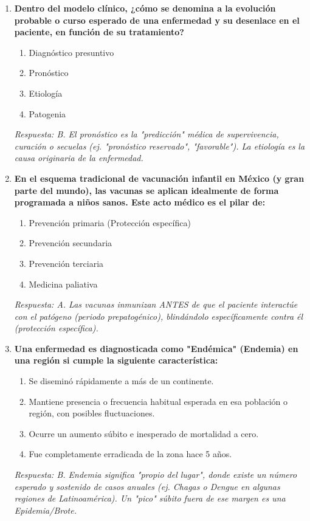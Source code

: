 \begin{enumerate}[label=\textbf{\arabic*.}]
    \item \textbf{Dentro del modelo clínico, ¿cómo se denomina a la evolución probable o curso esperado de una enfermedad y su desenlace en el paciente, en función de su tratamiento?}
    \begin{enumerate}
        \item[A)] Diagnóstico presuntivo
        \item[B)] Pronóstico
        \item[C)] Etiología
        \item[D)] Patogenia
    \end{enumerate}
    \textit{Respuesta: B. El pronóstico es la "predicción" médica de supervivencia, curación o secuelas (ej. "pronóstico reservado", "favorable"). La etiología es la causa originaria de la enfermedad.}

    \item \textbf{En el esquema tradicional de vacunación infantil en México (y gran parte del mundo), las vacunas se aplican idealmente de forma programada a niños sanos. Este acto médico es el pilar de:}
    \begin{enumerate}
        \item[A)] Prevención primaria (Protección específica)
        \item[B)] Prevención secundaria
        \item[C)] Prevención terciaria
        \item[D)] Medicina paliativa
    \end{enumerate}
    \textit{Respuesta: A. Las vacunas inmunizan ANTES de que el paciente interactúe con el patógeno (periodo prepatogénico), blindándolo específicamente contra él (protección específica).}

    \item \textbf{Una enfermedad es diagnosticada como "Endémica" (Endemia) en una región si cumple la siguiente característica:}
    \begin{enumerate}
        \item[A)] Se diseminó rápidamente a más de un continente.
        \item[B)] Mantiene presencia o frecuencia habitual esperada en esa población o región, con posibles fluctuaciones.
        \item[C)] Ocurre un aumento súbito e inesperado de mortalidad a cero.
        \item[D)] Fue completamente erradicada de la zona hace 5 años.
    \end{enumerate}
    \textit{Respuesta: B. Endemia significa "propio del lugar", donde existe un número esperado y sostenido de casos anuales (ej. Chagas o Dengue en algunas regiones de Latinoamérica). Un "pico" súbito fuera de ese margen es una Epidemia/Brote.}


\end{enumerate}
